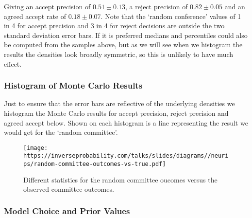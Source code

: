 \documentclass[a4paperpaper,]{article}
\begin{document}
Giving an accept precision of \(0.51 \pm 0.13\), a reject precision of
\(0.82 \pm 0.05\) and an agreed accept rate of \(0.18 \pm 0.07\). Note
that the `random conference' values of 1 in 4 for accept precision and 3
in 4 for reject decisions are outside the two standard deviation error
bars. If it is preferred medians and percentiles could also be computed
from the samples above, but as we will see when we histogram the results
the densities look broadly symmetric, so this is unlikely to have much
effect.

\hypertarget{histogram-of-monte-carlo-results}{%
\subsubsection{Histogram of Monte Carlo
Results}\label{histogram-of-monte-carlo-results}}

Just to ensure that the error bars are reflective of the underlying
densities we histogram the Monte Carlo results for accept precision,
reject precision and agreed accept below. Shown on each histogram is a
line representing the result we would get for the `random committee'.

\begin{figure}[htb]
\texttt{[image: https://inverseprobability.com/talks/slides/diagrams//neurips/random-committee-outcomes-vs-true.pdf]}


\caption{Different statistics for the random committee oucomes versus the observed committee outcomes.}
\label{random-committee-outcomes}
\end{figure}

\hypertarget{model-choice-and-prior-values}{%
\subsubsection{Model Choice and Prior
Values}\label{model-choice-and-prior-values}}
\end{document}
